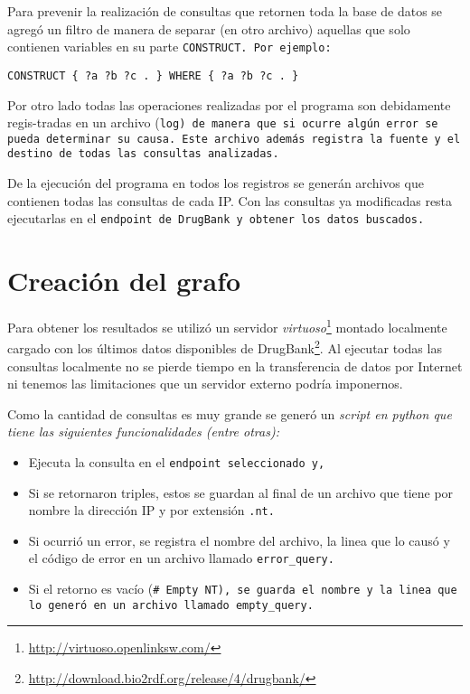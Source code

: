 Para prevenir la realización de consultas que retornen toda la base de datos se
agregó un filtro de manera de separar (en otro archivo) aquellas que solo
contienen variables en su parte \tt{CONSTRUCT}. Por ejemplo:
\begin{center}
  \tt{CONSTRUCT \{ ?a ?b ?c . \} WHERE \{ ?a ?b ?c . \}}
\end{center}

Por otro lado todas las operaciones realizadas por el programa son debidamente
regis-tradas en un archivo (\tt{log}) de manera que si ocurre algún error se
pueda determinar su causa. Este archivo además registra la fuente y el destino
de todas las consultas analizadas.

De la ejecución del programa en todos los registros se generán 
archivos que contienen todas las consultas de cada IP. Con las
consultas ya modificadas resta ejecutarlas en el \tt{endpoint} de DrugBank y
obtener los datos buscados.

\section{Creación del grafo}\label{d:cg}
Para obtener los resultados se utilizó un servidor
\emph{virtuoso}\footnote{\url{http://virtuoso.openlinksw.com/}} montado 
localmente cargado con los últimos datos disponibles de
DrugBank\footnote{\url{http://download.bio2rdf.org/release/4/drugbank/}}.
Al ejecutar todas las consultas localmente no se pierde tiempo en la
transferencia de datos por Internet ni tenemos las limitaciones que un servidor
externo podría imponernos. 

Como la cantidad de consultas es muy grande se generó un \it{script} en
\it{python} que tiene las siguientes funcionalidades (entre otras):
\begin{itemize}
  \item
    Ejecuta la consulta en el \tt{endpoint} seleccionado y,
  \item
    Si se retornaron triples, estos se guardan al final de un archivo que tiene
    por nombre la dirección IP y por extensión \tt{.nt}.
  \item
    Si ocurrió un error, se registra el nombre del archivo, la linea que lo
    causó y el código de error en un archivo llamado \tt{error\_query}.
  \item
    Si el retorno es vacío (\tt{\# Empty NT}), se guarda el nombre y la linea que
    lo generó en un archivo llamado \tt{empty\_query}.
\end{itemize}

